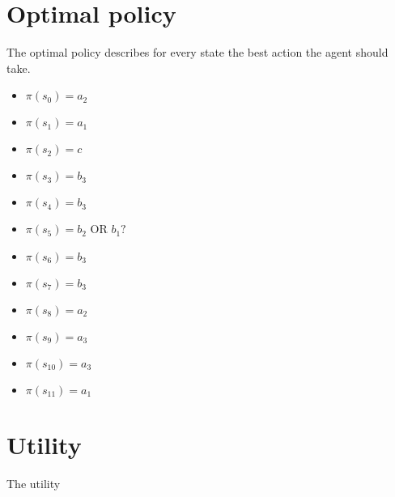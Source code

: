\documentclass[a4paper]{article}
\begin{document}
\section{Optimal policy}
The optimal policy describes for every state the best action the agent should take.
\begin{itemize}
\item $\pi(s_{0}) = a_{2}$
\item $\pi(s_{1}) = a_{1}$
\item $\pi(s_{2}) = c$
\item $\pi(s_{3}) = b_{3}$
\item $\pi(s_{4}) = b_{3}$
\item $\pi(s_{5}) = b_{2}$ OR $b_{1}?$
\item $\pi(s_{6}) = b_{3}$
\item $\pi(s_{7}) = b_{3}$
\item $\pi(s_{8}) = a_{2}$
\item $\pi(s_{9}) = a_{3}$
\item $\pi(s_{10}) = a_{3}$
\item $\pi(s_{11}) = a_{1}$
\end{itemize}

\section{Utility}
The utility
\end{document}
